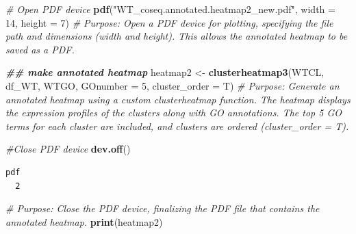 \documentclass[
  11pt,
]{article}
\newenvironment{Shaded}{\begin{snugshade}}{\end{snugshade}}
\newcommand{\AttributeTok}[1]{\textcolor[rgb]{0.13,0.29,0.53}{#1}}
\newcommand{\CommentTok}[1]{\textcolor[rgb]{0.56,0.35,0.01}{\textit{#1}}}
\newcommand{\DecValTok}[1]{\textcolor[rgb]{0.00,0.00,0.81}{#1}}
\newcommand{\DocumentationTok}[1]{\textcolor[rgb]{0.56,0.35,0.01}{\textbf{\textit{#1}}}}
\newcommand{\FunctionTok}[1]{\textcolor[rgb]{0.13,0.29,0.53}{\textbf{#1}}}
\newcommand{\NormalTok}[1]{#1}
\newcommand{\OtherTok}[1]{\textcolor[rgb]{0.56,0.35,0.01}{#1}}
\newcommand{\StringTok}[1]{\textcolor[rgb]{0.31,0.60,0.02}{#1}}
\begin{document}
\begin{Shaded}
\begin{Highlighting}[]
\CommentTok{\# Open PDF device}
\FunctionTok{pdf}\NormalTok{(}\StringTok{"WT\_coseq.annotated.heatmap2\_new.pdf"}\NormalTok{, }\AttributeTok{width =} \DecValTok{14}\NormalTok{, }\AttributeTok{height =} \DecValTok{7}\NormalTok{)}
\CommentTok{\# Purpose: Open a PDF device for plotting, specifying the file path and dimensions (width and height). This allows the annotated heatmap to be saved as a PDF.}

\DocumentationTok{\#\# make annotated heatmap}
\NormalTok{heatmap2 }\OtherTok{\textless{}{-}} \FunctionTok{clusterheatmap3}\NormalTok{(WTCL, df\_WT, WTGO, }\AttributeTok{GOnumber =} \DecValTok{5}\NormalTok{, }\AttributeTok{cluster\_order =}\NormalTok{ T)}
\CommentTok{\# Purpose: Generate an annotated heatmap using a custom \textasciigrave{}clusterheatmap\textasciigrave{} function. The heatmap displays the expression profiles of the clusters along with GO annotations. The top 5 GO terms for each cluster are included, and clusters are ordered (\textasciigrave{}cluster\_order = T\textasciigrave{}).}

\CommentTok{\#Close PDF device}
\FunctionTok{dev.off}\NormalTok{()}
\end{Highlighting}
\end{Shaded}

\begin{verbatim}
pdf 
  2 
\end{verbatim}

\begin{Shaded}
\begin{Highlighting}[]
\CommentTok{\# Purpose: Close the PDF device, finalizing the PDF file that contains the annotated heatmap.}
\FunctionTok{print}\NormalTok{(heatmap2)}
\end{Highlighting}
\end{Shaded}
\end{document}
